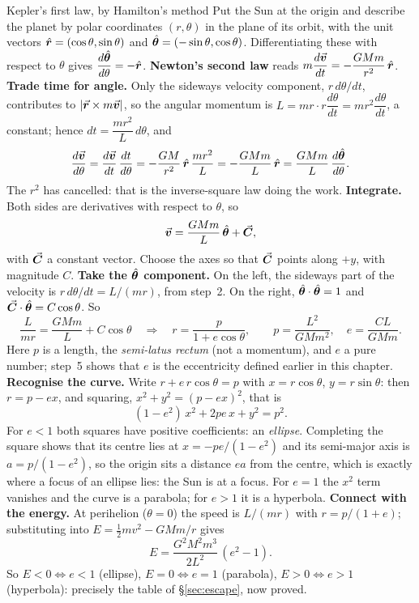 
\begin{derivbox}{Kepler's first law, by Hamilton's method}
Put the Sun at the origin and describe the planet by polar coordinates $(r,\theta)$ in the plane of its
orbit, with the unit vectors $\hat{\bm{r}}=(\cos\theta,\sin\theta)$ and $\hat{\bm{\theta}}=(-\sin\theta,\cos\theta)$.
Differentiating these with respect to $\theta$ gives $\dfrac{d\hat{\bm{\theta}}}{d\theta}=-\hat{\bm{r}}$.
 \textbf{Newton's second law} reads $m\dfrac{d\vec{\bm{v}}}{dt}=-\dfrac{GMm}{r^2}\,\hat{\bm{r}}$.
 \textbf{Trade time for angle.} Only the sideways velocity component, $r\,d\theta/dt$, contributes to
$|\vec{\bm{r}}\times m\vec{\bm{v}}|$, so the angular momentum is $L=mr\cdot r\dfrac{d\theta}{dt}=mr^2\dfrac{d\theta}{dt}$, a
constant; hence
$dt=\dfrac{mr^2}{L}\,d\theta$, and
\[
\frac{d\vec{\bm{v}}}{d\theta}=\frac{d\vec{\bm{v}}}{dt}\,\frac{dt}{d\theta}=-\frac{GM}{r^2}\,\hat{\bm{r}}\,\frac{mr^2}{L}
=-\frac{GMm}{L}\,\hat{\bm{r}}=\frac{GMm}{L}\,\frac{d\hat{\bm{\theta}}}{d\theta}.
\]
The $r^2$ has cancelled: that is the inverse-square law doing the work.
 \textbf{Integrate.} Both sides are derivatives with respect to $\theta$, so
\[
\vec{\bm{v}}=\frac{GMm}{L}\,\hat{\bm{\theta}}+\vec{\bm{C}},
\]
with $\vec{\bm{C}}$ a constant vector. Choose the axes so that $\vec{\bm{C}}$ points along $+y$, with magnitude $C$.
 \textbf{Take the $\hat{\bm{\theta}}$ component.} On the left, the sideways part of the velocity is
$r\,d\theta/dt=L/(mr)$, from step~2. On the right, $\hat{\bm{\theta}}\cdot\hat{\bm{\theta}}=1$ and
$\vec{\bm{C}}\cdot\hat{\bm{\theta}}=C\cos\theta$. So
\[
\frac{L}{mr}=\frac{GMm}{L}+C\cos\theta
\quad\Longrightarrow\quad
r=\frac{p}{1+e\cos\theta},\qquad p=\frac{L^2}{GMm^2},\quad e=\frac{CL}{GMm}.
\]
Here $p$ is a length, the \emph{semi-latus rectum} (not a momentum), and $e$ a pure number; step~5 shows
that $e$ is the eccentricity defined earlier in this chapter.
 \textbf{Recognise the curve.} Write $r+e\,r\cos\theta=p$ with $x=r\cos\theta$, $y=r\sin\theta$: then
$r=p-ex$, and squaring, $x^2+y^2=(p-ex)^2$, that is
\[
(1-e^2)\,x^2+2pe\,x+y^2=p^2 .
\]
For $e<1$ both squares have positive coefficients: an \emph{ellipse}. Completing the square shows that
its centre lies at $x=-pe/(1-e^2)$ and its semi-major axis is $a=p/(1-e^2)$, so the origin sits a distance
$ea$ from the centre, which is exactly where a focus of an ellipse lies: the Sun is at a focus. For
$e=1$ the $x^2$ term vanishes and the curve is a parabola; for $e>1$ it is a hyperbola.
 \textbf{Connect with the energy.} At perihelion ($\theta=0$) the speed is $L/(mr)$ with
$r=p/(1+e)$; substituting into $E=\tfrac12mv^2-GMm/r$ gives
\[
E=\frac{G^2M^2m^3}{2L^2}\,(e^2-1).
\]
So $E<0\Leftrightarrow e<1$ (ellipse), $E=0\Leftrightarrow e=1$ (parabola), $E>0\Leftrightarrow e>1$
(hyperbola): precisely the table of \S\ref{sec:escape}, now proved.
\end{derivbox}

